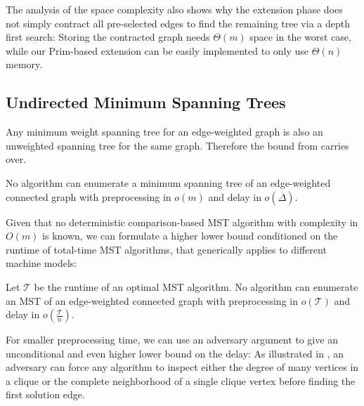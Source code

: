 \documentclass[a4paper, USenglish, cleveref, autoref, thm-restate]{lipics-v2021}
\newcommand{\avgdeg}{\overline{\Delta}}
\newcommand{\totaltime}{\mathcal{T}}
\begin{document}
The analysis of the space complexity also shows why the extension phase does not simply contract all pre-selected edges to find the remaining tree via a depth first search:
Storing the contracted graph needs $\Theta(m)$ space in the worst case, while our Prim-based extension can be easily implemented to only use $\Theta(n)$ memory.

\subsection{Undirected Minimum Spanning Trees}
\label{sec:umst}

Any minimum weight spanning tree for an edge-weighted graph is also an unweighted spanning tree for the same graph.
Therefore the bound from  carries over.
\begin{corollary}
	\label{cor:mst-avgdeg-lower}
	No algorithm can enumerate a minimum spanning tree of an edge-weighted connected graph with preprocessing in $o(m)$ and delay in $o(\avgdeg)$.
\end{corollary}

Given that no deterministic comparison-based MST algorithm with complexity in $O(m)$ is known, we can formulate a higher lower bound conditioned on the runtime of total-time MST algorithms, that generically applies to different machine models:
\begin{corollary}
	\label{cor:mst-algo-lower}
	Let $\totaltime$ be the runtime of an optimal MST algorithm.
	No algorithm can enumerate an MST of an edge-weighted connected graph with preprocessing in $o(\totaltime)$ and delay in $o(\frac{\totaltime}{n})$.
\end{corollary}

For smaller preprocessing time, we can use an adversary argument to give an unconditional and even higher lower bound on the delay:
As illustrated in , an adversary can force any algorithm to inspect either the degree of many vertices in a clique or the complete neighborhood of a single clique vertex before finding the first solution edge.
\end{document}
